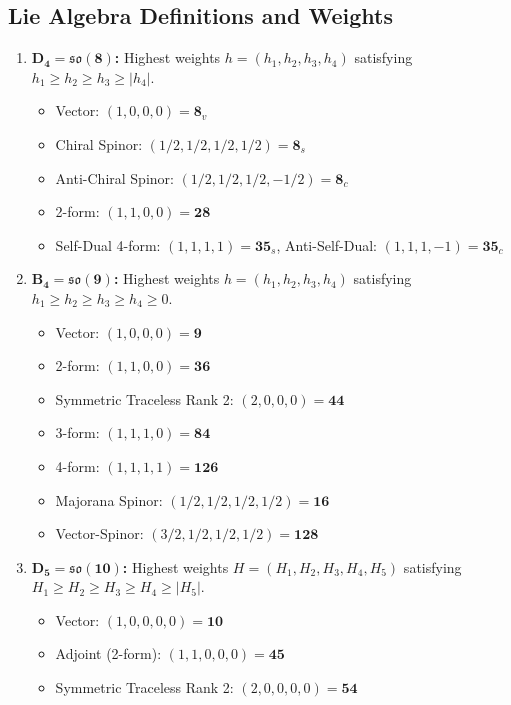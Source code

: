 \documentclass[11pt,a4paper]{article}
\begin{document}
\subsection{Lie Algebra Definitions and Weights}
\begin{enumerate}
    \item \textbf{$\bm{D_4 = \mathfrak{so}(8)}$:} Highest weights $h = (h_1, h_2, h_3, h_4)$ satisfying $h_1 \ge h_2 \ge h_3 \ge |h_4|$.
    \begin{itemize}
        \item Vector: $(1, 0, 0, 0) = \mathbf{8}_v$
        \item Chiral Spinor: $(1/2, 1/2, 1/2, 1/2) = \mathbf{8}_s$
        \item Anti-Chiral Spinor: $(1/2, 1/2, 1/2, -1/2) = \mathbf{8}_c$
        \item 2-form: $(1, 1, 0, 0) = \mathbf{28}$
        \item Self-Dual 4-form: $(1, 1, 1, 1) = \mathbf{35}_s$, Anti-Self-Dual: $(1, 1, 1, -1) = \mathbf{35}_c$
    \end{itemize}
    \item \textbf{$\bm{B_4 = \mathfrak{so}(9)}$:} Highest weights $h = (h_1, h_2, h_3, h_4)$ satisfying $h_1 \ge h_2 \ge h_3 \ge h_4 \ge 0$.
    \begin{itemize}
        \item Vector: $(1, 0, 0, 0) = \mathbf{9}$
        \item 2-form: $(1, 1, 0, 0) = \mathbf{36}$
        \item Symmetric Traceless Rank 2: $(2, 0, 0, 0) = \mathbf{44}$
        \item 3-form: $(1, 1, 1, 0) = \mathbf{84}$
        \item 4-form: $(1, 1, 1, 1) = \mathbf{126}$
        \item Majorana Spinor: $(1/2, 1/2, 1/2, 1/2) = \mathbf{16}$
        \item Vector-Spinor: $(3/2, 1/2, 1/2, 1/2) = \mathbf{128}$
    \end{itemize}
    \item \textbf{$\bm{D_5 = \mathfrak{so}(10)}$:} Highest weights $H = (H_1, H_2, H_3, H_4, H_5)$ satisfying $H_1 \ge H_2 \ge H_3 \ge H_4 \ge |H_5|$.
    \begin{itemize}
        \item Vector: $(1, 0, 0, 0, 0) = \mathbf{10}$
        \item Adjoint (2-form): $(1, 1, 0, 0, 0) = \mathbf{45}$
        \item Symmetric Traceless Rank 2: $(2, 0, 0, 0, 0) = \mathbf{54}$

\end{itemize}
\end{enumerate}
\end{document}
